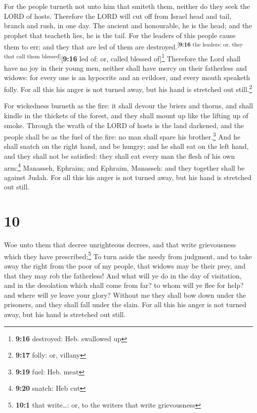  For the people turneth not unto him that smiteth them,
neither do they seek the LORD of hosts.  Therefore the
LORD will cut off from Israel head and tail, branch and rush, in one
day.  The ancient and honourable, he is the head; and the
prophet that teacheth lies, he is the tail.  For the
leaders of this people cause them to err; and they that are led of them
are destroyed.\textsuperscript{{[}\textbf{9:16} the leaders: or, they
that call them blessed{]}}{[}\textbf{9:16} led of: or, called blessed
of{]}\footnote{\textbf{9:16} destroyed: Heb. swallowed up}
 Therefore the Lord shall have no joy in their young men,
neither shall have mercy on their fatherless and widows: for every one
is an hypocrite and an evildoer, and every mouth speaketh folly. For all
this his anger is not turned away, but his hand is stretched out
still.\footnote{\textbf{9:17} folly: or, villany}

 For wickedness burneth as the fire: it shall devour the
briers and thorns, and shall kindle in the thickets of the forest, and
they shall mount up like the lifting up of smoke. 
Through the wrath of the LORD of hosts is the land darkened, and the
people shall be as the fuel of the fire: no man shall spare his
brother.\footnote{\textbf{9:19} fuel: Heb. meat}  And he
shall snatch on the right hand, and be hungry; and he shall eat on the
left hand, and they shall not be satisfied: they shall eat every man the
flesh of his own arm:\footnote{\textbf{9:20} snatch: Heb cut}
 Manasseh, Ephraim; and Ephraim, Manasseh: and they
together shall be against Judah. For all this his anger is not turned
away, but his hand is stretched out still.

\hypertarget{section-9}{%
\section{10}\label{section-9}}

 Woe unto them that decree unrighteous decrees, and that
write grievousness which they have prescribed;\footnote{\textbf{10:1}
  that write\ldots: or, to the writers that write grievousness}
 To turn aside the needy from judgment, and to take away
the right from the poor of my people, that widows may be their prey, and
that they may rob the fatherless!  And what will ye do in
the day of visitation, and in the desolation which shall come from far?
to whom will ye flee for help? and where will ye leave your glory?
 Without me they shall bow down under the prisoners, and
they shall fall under the slain. For all this his anger is not turned
away, but his hand is stretched out still.

